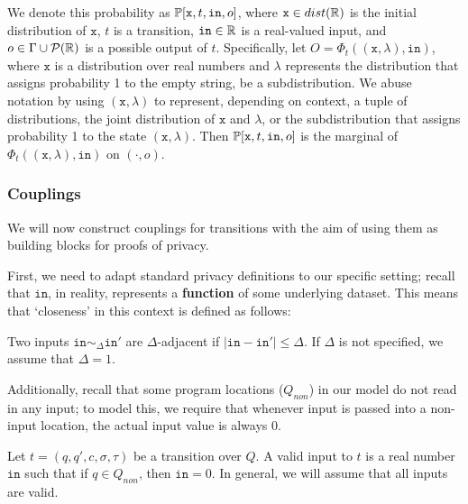 We denote this probability as $\mathbb{P}[\texttt{x}, t, \texttt{in}, o]$, where $\texttt{x} \in dist(\mathbb{R})$ is the initial distribution of $\texttt{x}$, $t$ is a transition, $\texttt{in}\in \mathbb{R}$ is a real-valued input, and $o\in \Gamma\cup \mathcal{P}(\mathbb{R})$ is a possible output of $t$. 
Specifically, let $O = \Phi_t((\texttt{x}, \lambda), \texttt{in})$, where $\texttt{x}$ is a distribution over real numbers and $\lambda$ represents the distribution that assigns probability 1 to the empty string, be a subdistribution.
 We abuse notation by using $(\texttt{x}, \lambda)$ to represent, depending on context, a tuple of distributions, the joint distribution of $\texttt{x}$ and $\lambda$, or the subdistribution that assigns probability 1 to the state $(\texttt{x}, \lambda)$. Then $\mathbb{P}[\texttt{x}, t, \texttt{in}, o]$ is the marginal of $\Phi_t((\texttt{x}, \lambda), \texttt{in})$ on $(\cdot, o)$.

\subsubsection{Couplings}

We will now construct couplings for transitions with the aim of using them as building blocks for proofs of privacy.

First, we need to adapt standard privacy definitions to our specific setting; recall that $\texttt{in}$, in reality, represents a \textbf{function} of some underlying dataset. This means that `closeness' in this context is defined as follows:

\begin{defn}[Adjacency]
    Two inputs $\texttt{in}\sim_{\Delta} \texttt{in}'$ are $\Delta$-adjacent if $|\texttt{in}-\texttt{in}'|\leq \Delta$. If $\Delta$ is not specified, we assume that $\Delta = 1$. 
\end{defn}

Additionally, recall that some program locations ($Q_{non}$) in our model do not read in any input; to model this, we require that whenever input is passed into a non-input location, the actual input value is always 0.

\begin{defn}
    Let $t = (q, q', c, \sigma, \tau)$ be a transition over $Q$. A valid input to $t$ is a real number $\texttt{in}$ such that if $q\in Q_{non}$, then $\texttt{in} = 0$.
    In general, we will assume that all inputs are valid.
\end{defn}

